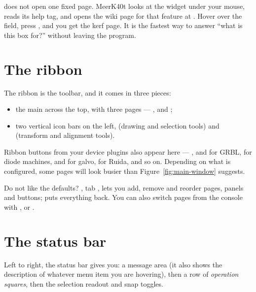 \begin{behindbox}
 does not open one fixed page. MeerK40t looks at the widget under your
mouse, reads its help tag, and opens the wiki page for that feature at
. Hover over the 
field, press , and you get the kerf page. It is the fastest way to
answer ``what is this box for?'' without leaving the program.
\end{behindbox}

\section{The ribbon}

The ribbon is the toolbar, and it comes in three pieces:

\begin{itemize}
  \item the main  across the top, with three pages ---
        ,  and ;
  \item two vertical icon bars on the left,  (drawing and selection
        tools) and  (transform and alignment tools).
\end{itemize}

\noindent Ribbon buttons from your device plugins also appear here ---
,  and  for GRBL,  for diode
machines,  and  for galvo,  for Ruida,
and so on. Depending on what is configured, some pages will look busier than
Figure~\ref{fig:main-window} suggests.

\begin{tipbox}
Do not like the defaults? , tab
, lets you add, remove and reorder pages, panels and buttons;
 puts everything back. You can also switch pages from the
console with ,  or .
\end{tipbox}

\section{The status bar}

Left to right, the status bar gives you: a message area (it also shows the
description of whatever menu item you are hovering), then a row of
\emph{operation squares}, then the selection readout and snap toggles.

